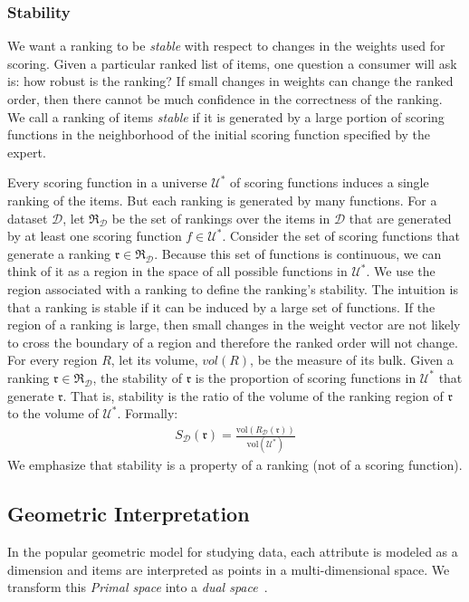 \subsubsection{Stability}
We want a ranking to be {\em stable} with respect to changes in the weights used for scoring.  Given a particular ranked list of items, one question a consumer will ask is: how robust is the ranking? If small changes in weights can change the ranked order, then there cannot be much confidence in the correctness of the ranking. We call a ranking of items {\em stable} if it is generated by a large portion of scoring functions in the neighborhood of the initial scoring function specified by the expert. 

Every scoring function in a universe $\mathcal{U}^*$ of scoring functions induces a single ranking of the items. But each ranking is generated by many functions.
For a dataset $\mathcal{D}$, let $\mathfrak{R}_\mathcal{D}$ be the set of rankings over the items in $\mathcal{D}$ that are generated by at least one scoring function $f\in\mathcal{U}^*$. 
Consider the set of scoring functions that generate a ranking $\mathfrak{r}\in\mathfrak{R}_\mathcal{D}$.
Because this set of functions is continuous, we can think of it as a region in the space of all possible functions in $\mathcal{U}^*$.
We use the region associated with a ranking to define the ranking's stability. The intuition is that a ranking is stable if it can be induced by a large set of functions.
If the region of a ranking is large, then small changes in the weight vector are not likely to cross the boundary of a region and therefore the ranked order will not change. 
For every region $R$, let its volume, $vol(R)$, be the measure of its bulk.
Given a ranking $\mathfrak{r}\in\mathfrak{R}_\mathcal{D}$, the stability of $\mathfrak{r}$ is the proportion of scoring functions in $\mathcal{U}^*$ that generate $\mathfrak{r}$.
That is, stability is the ratio of the volume of the ranking region of $\mathfrak{r}$ to the volume of $\mathcal{U}^*$. Formally:
\begin{align}
S_\mathcal{D}(\mathfrak{r}) = \frac{\mbox{vol}(R_\mathcal{D}(\mathfrak{r}))}{\mbox{vol}(\mathcal{U}^*)}
\end{align}
We emphasize that stability is a property of a ranking (not of a scoring function).


\subsection{Geometric Interpretation}\label{sec:bgnd} %
In the popular geometric model for studying data, each attribute is modeled as a dimension and items are interpreted as points in a multi-dimensional space.
We transform this {\em Primal space} into a {\em dual space}~\cite{edelsbrunner}.

